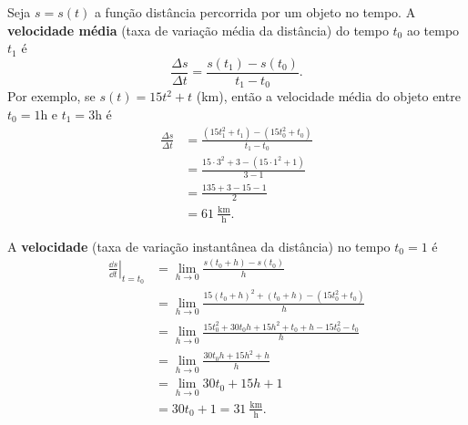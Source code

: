 \begin{ex}
  Seja $s = s(t)$ a função distância percorrida por um objeto no tempo. A {\bf velocidade média} (taxa de variação média da distância) do tempo $t_0$ ao tempo $t_1$ é
  \begin{equation}
    \frac{\Delta s}{\Delta t} = \frac{s(t_1)-s(t_0)}{t_1-t_0}.
  \end{equation}
  Por exemplo, se $s(t) = 15t^2+t$ (km), então a velocidade média do objeto entre $t_0=1$h e $t_1=3$h é
  \begin{align}
    \frac{\Delta s}{\Delta t} &= \frac{(15t_1^2+t_1)-(15t_0^2+t_0)}{t_1-t_0}\\
                              &= \frac{15\cdot 3^2+3-(15\cdot 1^2+1)}{3-1}\\
                              &= \frac{135+3-15-1}{2}\\
                              &= 61~\frac{\text{km}}{\text{h}}.
  \end{align}

  A {\bf velocidade} (taxa de variação instantânea da distância) no tempo $t_0=1$ é
  \begin{align}
    \left.\frac{\dd s}{\dd t}\right|_{t=t_0} &= \lim_{h\to 0} \frac{s(t_0+h)-s(t_0)}{h} \\
                                             &= \lim_{h\to 0} \frac{15(t_0+h)^2+(t_0+h)-\left(15t_0^2+t_0\right)}{h}\\
                                             &= \lim_{h\to 0} \frac{15t_0^2+30t_0h+15h^2+t_0+h-15t_0^2-t_0}{h}\\
                                             &= \lim_{h\to 0} \frac{30t_0h+15h^2+h}{h}\\
                                             &= \lim_{h\to 0} 30t_0 + 15h + 1 \\
                                             &= 30t_0+1 = 31~\frac{\text{km}}{\text{h}}.
  \end{align}
\end{ex}

